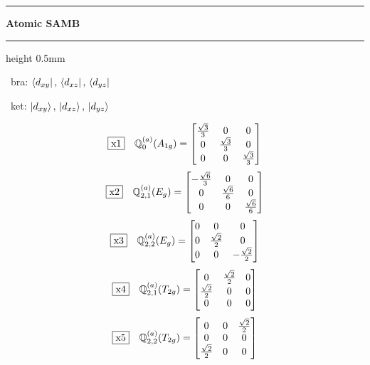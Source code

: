 \documentclass[fleqn,10pt,landscape]{jsarticle}
\begin{document}
\vspace{5mm}
\noindent \rule[0.5mm]{5mm}{0.5mm}\hspace{3mm}\textbf{Atomic SAMB}\hspace{3mm}\leaders\hrule height 0.5mm\hfill\kern0pt
\vspace{3mm}

\vspace{5mm}

\noindent\textbullet\, bra: $\bra{d_{xy}},\, \bra{d_{xz}},\, \bra{d_{yz}}$

\noindent\textbullet\, ket: $\ket{d_{xy}},\, \ket{d_{xz}},\, \ket{d_{yz}}$

\begin{dmath*}
\fbox{x1}\quad \mathbb{Q}_{0}^{(a)}(A_{1g})=\begin{bmatrix} \frac{\sqrt{3}}{3} & 0 & 0 \\ 0 & \frac{\sqrt{3}}{3} & 0 \\ 0 & 0 & \frac{\sqrt{3}}{3} \end{bmatrix}
\end{dmath*}
\begin{dmath*}
\fbox{x2}\quad \mathbb{Q}_{2,1}^{(a)}(E_{g})=\begin{bmatrix} - \frac{\sqrt{6}}{3} & 0 & 0 \\ 0 & \frac{\sqrt{6}}{6} & 0 \\ 0 & 0 & \frac{\sqrt{6}}{6} \end{bmatrix}
\end{dmath*}
\begin{dmath*}
\fbox{x3}\quad \mathbb{Q}_{2,2}^{(a)}(E_{g})=\begin{bmatrix} 0 & 0 & 0 \\ 0 & \frac{\sqrt{2}}{2} & 0 \\ 0 & 0 & - \frac{\sqrt{2}}{2} \end{bmatrix}
\end{dmath*}
\begin{dmath*}
\fbox{x4}\quad \mathbb{Q}_{2,1}^{(a)}(T_{2g})=\begin{bmatrix} 0 & \frac{\sqrt{2}}{2} & 0 \\ \frac{\sqrt{2}}{2} & 0 & 0 \\ 0 & 0 & 0 \end{bmatrix}
\end{dmath*}
\begin{dmath*}
\fbox{x5}\quad \mathbb{Q}_{2,2}^{(a)}(T_{2g})=\begin{bmatrix} 0 & 0 & \frac{\sqrt{2}}{2} \\ 0 & 0 & 0 \\ \frac{\sqrt{2}}{2} & 0 & 0 \end{bmatrix}
\end{dmath*}
\end{document}

